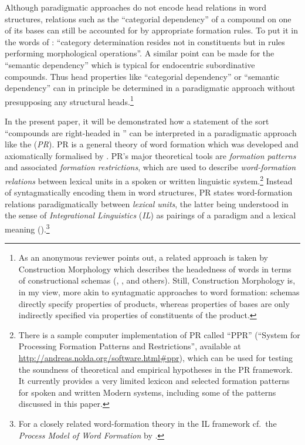 \documentclass[output=paper
  ,nobabel
  ,draftmode
  ,colorlinks, citecolor=brown
]{langscibook}
\begin{document}
Although paradigmatic approaches do not encode head relations in word
structures, relations such as the ``categorial dependency'' of
a compound on one of its bases can still be accounted for by appropriate
formation rules. To put it in the words of \citet[2]{Zwicky:1985:heads}: ``category determination resides not in
constituents but in rules performing morphological operations''. A similar
point can be made for the ``semantic dependency'' which is
typical for endocentric subordinative compounds. Thus head properties like
``categorial dependency'' or ``semantic
dependency'' can in principle be determined in a paradigmatic approach
without presupposing any structural heads.\footnote{As an anonymous reviewer points
out, a related approach is taken by Construction Morphology which describes the
headedness of words in terms of constructional schemas (\citealt[Section 1.4 and~3.1]{booij:2010:construction:morphology}, \citealt{arcodia:2012:constructions:headedness}, and
others). Still, Construction Morphology is, in my view, more akin to syntagmatic
approaches to word formation: schemas directly specify properties of products,
whereas properties of bases are only indirectly specified via properties of
constituents of the product.}

In the present paper, it will be demonstrated how a statement of the sort
``compounds are right-headed in '' can be
interpreted in a paradigmatic approach like the \emph{} (\emph{PR}). PR is a
general theory of word formation which was developed and axiomatically
formalised by \citet{nolda:2012:konversion:deutschen,nolda:2018:explaining:linguistic}. PR’s major theoretical tools are
\emph{formation patterns} and associated \emph{formation
restrictions}, which are used to describe \emph{word-formation
relations} between lexical units in a spoken or written linguistic
system.\footnote{There is a sample computer implementation of PR called ``PPR'' (``System for Processing Formation Patterns and
Restrictions'', available at \url{http://andreas.nolda.org/software.html\#ppr}), which can be used for
testing the soundness of theoretical and empirical hypotheses in the PR
framework. It currently provides a very limited lexicon and selected formation
patterns for spoken and written Modern  systems, including some of the
patterns discussed in this paper.} Instead of syntagmatically encoding
them in word structures, PR states word-formation relations paradigmatically
between \emph{lexical units}, the latter being understood in the sense of
\emph{Integrational Linguistics} (\emph{IL}) as pairings of a
paradigm and a lexical meaning (\citealt{lieb:1983:integrational:linguistics:1,lieb:1992:paradigma:klassifikation,lieb:2005:notions:paradigm}).\footnote{For a closely related word-formation theory
in the IL framework cf.\ the \emph{Process Model of Word Formation} by \citet{lieb:2013:general:theory}.}
\end{document}
